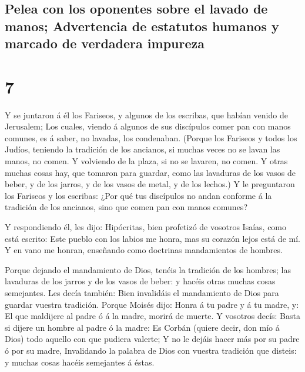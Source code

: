 \hypertarget{pelea-con-los-oponentes-sobre-el-lavado-de-manos-advertencia-de-estatutos-humanos-y-marcado-de-verdadera-impureza}{%
\subsection{Pelea con los oponentes sobre el lavado de manos;
Advertencia de estatutos humanos y marcado de verdadera
impureza}\label{pelea-con-los-oponentes-sobre-el-lavado-de-manos-advertencia-de-estatutos-humanos-y-marcado-de-verdadera-impureza}}

\hypertarget{section-41-7}{%
\section{7}\label{section-41-7}}

 Y se juntaron á él los Fariseos, y algunos de los
escribas, que habían venido de Jerusalem;  Los cuales,
viendo á algunos de sus discípulos comer pan con manos comunes, es á
saber, no lavadas, los condenaban.  (Porque los Fariseos y
todos los Judíos, teniendo la tradición de los ancianos, si muchas veces
no se lavan las manos, no comen.  Y volviendo de la plaza,
si no se lavaren, no comen. Y otras muchas cosas hay, que tomaron para
guardar, como las lavaduras de los vasos de beber, y de los jarros, y de
los vasos de metal, y de los lechos.)  Y le preguntaron
los Fariseos y los escribas: ¿Por qué tus discípulos no andan conforme á
la tradición de los ancianos, sino que comen pan con manos comunes?

 Y respondiendo él, les dijo: Hipócritas, bien profetizó
de vosotros Isaías, como está escrito: Este pueblo con los labios me
honra, mas su corazón lejos está de mí.  Y en vano me
honran, enseñando como doctrinas mandamientos de hombres.

 Porque dejando el mandamiento de Dios, tenéis la
tradición de los hombres; las lavaduras de los jarros y de los vasos de
beber: y hacéis otras muchas cosas semejantes.  Les decía
también: Bien invalidáis el mandamiento de Dios para guardar vuestra
tradición.  Porque Moisés dijo: Honra á tu padre y á tu
madre, y: El que maldijere al padre ó á la madre, morirá de muerte.
 Y vosotros decís: Basta si dijere un hombre al padre ó
la madre: Es Corbán (quiere decir, don mío á Dios) todo aquello con que
pudiera valerte;  Y no le dejáis hacer más por su padre ó
por su madre,  Invalidando la palabra de Dios con vuestra
tradición que disteis: y muchas cosas hacéis semejantes á éstas.

